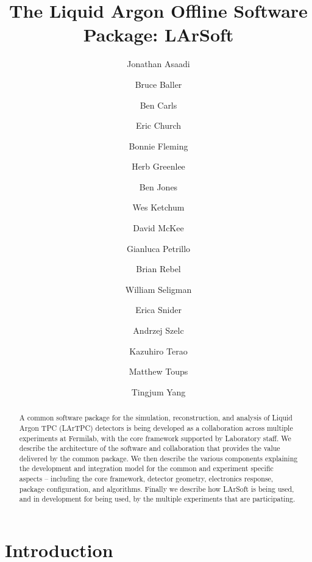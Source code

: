 \documentclass[12pt]{elsarticle}
\begin{document}
\title{The Liquid Argon Offline Software Package: LArSoft} 
\author{Jonathan Asaadi}
\address{}
\ead{}
\author{Bruce Baller}
\address{}
\ead{}
\author{Ben Carls}
\address{}
\ead{}

\author{Eric Church}
\address{Yale University, PO Box 500, MS309, Fermi National Accelerator Lab, Batavia, IL, USA, 60510-5011}
\author{Bonnie Fleming}
\address{Yale University, PO Box XYZ, Physics Department, Yale University, New Haven, CT, USA, 12345-1234}
\author{Herb Greenlee}
\address{}
\ead{}
\author{Ben Jones}
\address{}
\ead{}
\author{Wes Ketchum}
\address{}
\ead{}
\author{David McKee}
\address{}
\ead{}

\author{Gianluca Petrillo}
\address{}
\ead{}
\author{Brian Rebel}
\address{PO Box XYZ, MS309, Fermi National Accelerator Lab, Batavia, IL, USA, 60510-5011}
\author{William Seligman}
\address{Columbia University Nevis Laboratories, PO Box 137, Irvington, NY, USA, 10533}
\ead{}
\author{Erica Snider}
\address{}
\ead{}

\author{Andrzej Szelc}
\address{}
\ead{}

\author{Kazuhiro Terao}
\address{}
\ead{}
\author{Matthew Toups}
\address{}
\ead{}
\author{Tingjum Yang}
\address{}
\ead{}
\begin{abstract}
A common software package for the simulation, reconstruction, and analysis of Liquid Argon TPC (LArTPC) detectors is being developed as a collaboration across multiple experiments at Fermilab, with the core framework supported by Laboratory staff. We describe the architecture of the software and collaboration that provides the value delivered by the common package. We then describe the various components explaining the development and integration model for the common and experiment specific aspects – including the core framework, detector geometry, electronics response, package configuration, and algorithms. Finally we describe how LArSoft is being used, and in development for being used, by the multiple experiments that are participating.

\end{abstract}
\tableofcontents

\maketitle

\section{Introduction}
\end{document}
